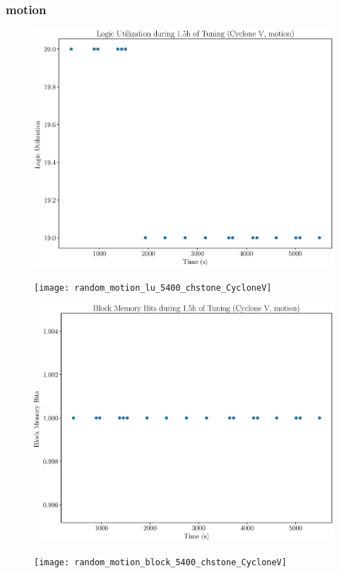 \documentclass[12pt, a4paper]{article}
\begin{document}
\newpage

\subsubsection{motion}

\begin{figure}[htpb]
    \centering
    \noindent
    \begin{minipage}{.48\textwidth}
        \centering
        \includegraphics[scale=.25]{motion_lu_5400_chstone_CycloneV}
    \end{minipage}%
    \hfill
    \begin{minipage}{.48\textwidth}
        \centering
        \texttt{[image: random\_motion\_lu\_5400\_chstone\_CycloneV]}
    \end{minipage}%

    \begin{minipage}{.48\textwidth}
        \includegraphics[scale=.25]{motion_block_5400_chstone_CycloneV}
    \end{minipage}%
    \hfill
    \begin{minipage}{.48\textwidth}
        \texttt{[image: random\_motion\_block\_5400\_chstone\_CycloneV]}
    \end{minipage}%


\end{figure}
\end{document}
